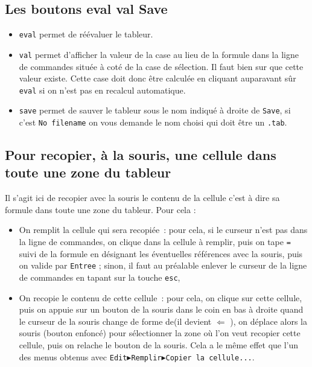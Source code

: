 \documentclass[a4paper,11pt]{article}
\begin{document}
\subsection{Les boutons eval val Save}
\begin{itemize}
\item {\tt eval} permet de r\'e\'evaluer le tableur.
\item {\tt val} permet d'afficher la valeur de la case au lieu de la formule
dans la ligne de commandes situ\'ee \`a cot\'e de la case de s\'election.
Il faut bien sur que cette valeur existe. Cette case doit donc \^etre 
calcul\'ee en cliquant auparavant s\^ur {\tt eval} si on n'est pas en recalcul 
automatique.
\item {\tt save} permet de sauver le tableur sous le nom indiqu\'e \`a droite
de {\tt Save}, si c'est {\tt No filename} on vous demande le nom choisi qui
doit \^etre un {\tt .tab}. 
\end{itemize}

\subsection{Pour recopier, \`a la souris, une cellule dans toute une zone du tableur}
Il s'agit ici de recopier avec la souris le contenu de la cellule c'est \`a 
dire sa formule dans toute une zone du tableur.
Pour cela :
\begin{itemize}
\item On remplit la cellule qui sera recopi\'ee~:
pour cela, si le curseur n'est pas dans la ligne de commandes, 
on clique dans la cellule \`a remplir, puis on tape {\tt =} suivi de la 
formule en d\'esignant les \'eventuelles r\'ef\'erences avec la
souris, puis on valide par {\tt Entree} ; sinon,
il faut au pr\'ealable enlever le curseur de la ligne de commandes
en tapant sur la touche {\tt esc},
\item On  recopie le contenu de cette cellule~: 
pour cela, on clique sur cette cellule, puis
on appuie sur un bouton de la souris dans le coin en bas \`a droite quand 
le curseur de la souris change de forme de(il devient $\Leftarrow$ ), 
on d\'eplace alors la souris (bouton 
enfonc\'e) pour s\'electionner la
zone o\`u l'on veut recopier cette cellule, 
puis on relache le bouton de la souris. 
Cela a le m\^eme effet que l'un des menus obtenus avec 
{\tt Edit$\blacktriangleright$Remplir$\blacktriangleright$Copier la cellule...}.
\end{itemize}
\end{document}
